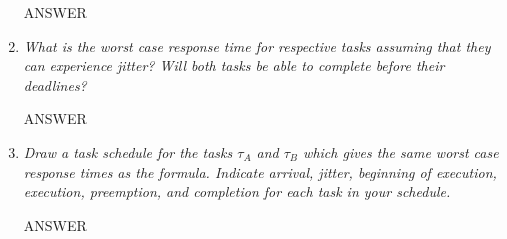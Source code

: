 \documentclass[a4paper,10pt]{article}
\begin{document}
\begin{enumerate}
	ANSWER
	\item \emph{What is the worst case response time for respective tasks assuming that they can experience jitter? Will both tasks be able to complete before their deadlines?}
	
	ANSWER
	\item \emph{Draw a task schedule for the tasks $\tau_A$ and $\tau_B$ which gives the same worst case response times as the formula. Indicate arrival, jitter, beginning of execution, execution, preemption, and completion for each task in your schedule.}
	
	ANSWER
\end{enumerate}
\end{document}
